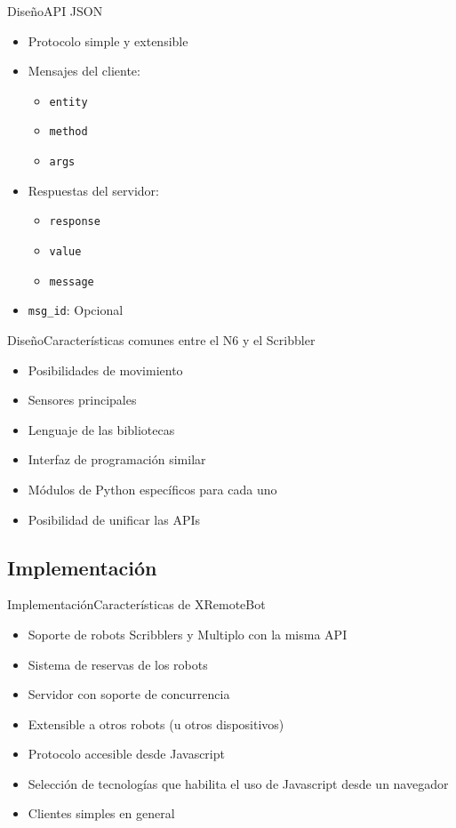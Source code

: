 \documentclass{beamer}
\begin{document}
\begin{frame}{Diseño}{API JSON}
    \begin{itemize}[<+->]
        \item Protocolo simple y extensible
        \item Mensajes del cliente:
        \begin{itemize}
            \item \texttt{entity}
            \item \texttt{method}
            \item \texttt{args}
        \end{itemize}
        \item Respuestas del servidor:
        \begin{itemize}
            \item \texttt{response}
            \item \texttt{value}
            \item \texttt{message}
        \end{itemize}
        \item \texttt{msg\_id}: Opcional
    \end{itemize}
\end{frame}


\begin{frame}{Diseño}{Características comunes entre el N6 y el Scribbler}
    \begin{itemize}[<+->]
        \item Posibilidades de movimiento
        \item Sensores principales
        \item Lenguaje de las bibliotecas
        \item Interfaz de programación similar
        \item Módulos de Python específicos para cada uno
        \item Posibilidad de unificar las APIs
    \end{itemize}
\end{frame}

\subsection{Implementación}
\begin{frame}{Implementación}{Características de XRemoteBot}
    \begin{itemize}[<+->]
        \item Soporte de robots Scribblers y Multiplo con la misma API
        \item Sistema de reservas de los robots
        \item Servidor con soporte de concurrencia
        \item Extensible a otros robots (u otros dispositivos)
        \item Protocolo accesible desde Javascript
        \item Selección de tecnologías que habilita el uso de Javascript
            desde un navegador
        \item Clientes simples en general
    \end{itemize}
\end{frame}
\end{document}
